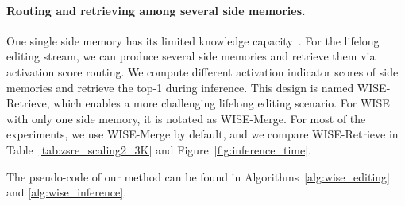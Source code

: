 \paragraph{Routing and retrieving among several side memories.} One single side memory has its limited knowledge capacity~\cite{knowledge_capacity}. For the lifelong editing stream, we can produce several side memories and retrieve them via activation score routing. We compute different activation indicator scores of side memories and retrieve the top-1 during inference. This design is named WISE-Retrieve, which enables a more challenging lifelong editing scenario.
For WISE with only one side memory, it is notated as WISE-Merge. 
For most of the experiments, we use WISE-Merge by default, and we compare WISE-Retrieve in Table~\ref{tab:zsre_scaling2_3K} and Figure~\ref{fig:inference_time}.

The pseudo-code of our method can be found in Algorithms~\ref{alg:wise_editing} and \ref{alg:wise_inference}.